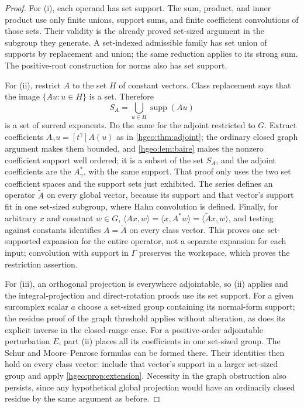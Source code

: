 \documentclass[11pt,letterpaper]{article}
\numberwithin{equation}{section}
\theoremstyle{definition}
\theoremstyle{remark}
\newcommand{\supp}{\operatorname{supp}}
\newcommand{\ip}[2]{\langle #1,#2\rangle}
\newcommand{\coeff}[2]{[t^{#1}]#2}
\begin{document}
\begin{proof}
For (i), each operand has set support. The sum, product, and inner
product use only finite unions, support sums, and finite coefficient
convolutions of those sets. Their validity is the already proved
set-sized argument in the subgroup they generate. A set-indexed
admissible family has set union of supports by replacement and union;
the same reduction applies to its strong sum. The positive-root
construction for norms also has set support.

For (ii), restrict $A$ to the set $H$ of constant vectors. Class
replacement says that the image $\{Au:u\in H\}$ is a set. Therefore
\[
 S_A=\bigcup_{u\in H}\supp(Au)
\]
is a set of surreal exponents. Do the same for the adjoint restricted
to $G$. Extract coefficients $A_\gamma u=\coeff{\gamma}{A(u)}$ as in
\cref{hgeo:thm:adjoint}; the ordinary closed graph argument makes them
bounded, and \cref{hgeo:lem:baire} makes the nonzero coefficient support well
ordered; it is a subset of the set $S_A$, and the adjoint coefficients are
the $A_\gamma^*$, with the same support. That proof only uses the two set
coefficient spaces and the support sets just exhibited. The series defines
an operator $\widetilde A$ on every global vector, because its support and
that vector's support fit in one set-sized subgroup, where Hahn convolution
is defined. Finally, for arbitrary $x$ and constant $w\in G$,
$\ip{Ax}{w}=\ip{x}{A^*w}=\ip{\widetilde Ax}{w}$, and testing against constants
identifies $A=\widetilde A$ on every class vector. This proves one
set-supported expansion for the entire operator, not a separate expansion
for each input; convolution with support in $\Gamma$ preserves the
workspace, which proves the restriction assertion.

For (iii), an orthogonal projection is everywhere adjointable, so
(ii) applies and the integral-projection and direct-rotation proofs
use its set support. For a given surcomplex scalar $a$ choose a
set-sized group containing its normal-form support; the residue
proof of the graph threshold applies without alteration, as does
its explicit inverse in the closed-range case. For a positive-order
adjointable perturbation $E$, part (ii) places all its coefficients
in one set-sized group. The Schur and Moore--Penrose formulas can
be formed there. Their identities then hold on every class vector:
include that vector's support in a larger set-sized group and apply
\cref{hgeo:prop:extension}. Necessity in the graph obstruction
also persists, since any hypothetical global projection would have
an ordinarily closed residue by the same argument as before.
\end{proof}
\end{document}
